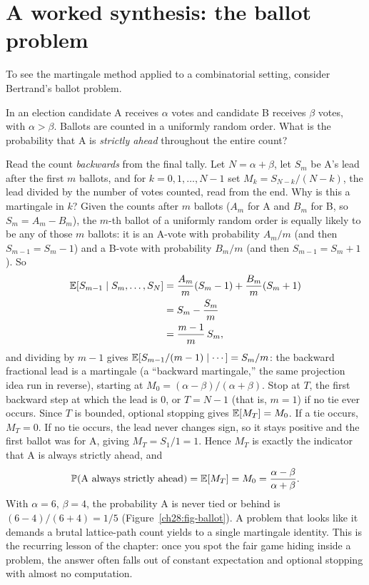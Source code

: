 \section{A worked synthesis: the ballot problem}
\label{ch28:ballot}

To see the martingale method applied to a combinatorial setting, consider Bertrand's ballot problem.

\begin{example}
\label{ch28:ex-ballot}
In an election candidate A receives $\alpha$ votes and candidate B receives $\beta$ votes, with
$\alpha > \beta$. Ballots are counted in a uniformly random order. What is the probability that A is
\emph{strictly ahead} throughout the entire count?

Read the count \emph{backwards} from the final tally. Let $N = \alpha + \beta$, let $S_m$ be A's
lead after the first $m$ ballots, and for $k = 0, 1, \dots, N-1$ set $M_k = S_{N-k}/(N-k)$, the
lead divided by the number of votes counted, read from the end. Why is this a martingale in $k$?
Given the counts after $m$ ballots ($A_m$ for A and $B_m$ for B, so $S_m = A_m - B_m$), the
$m$-th ballot of a uniformly random order is equally likely to be any of those $m$ ballots: it
is an A-vote with probability $A_m/m$ (and then $S_{m-1} = S_m - 1$) and a B-vote with
probability $B_m/m$ (and then $S_{m-1} = S_m + 1$). So
\begin{align*}
  \operatorname{\mathbb{E}}[S_{m-1} \mid S_m, \dots, S_N]
  &= \frac{A_m}{m}(S_m - 1) + \frac{B_m}{m}(S_m + 1) \\
  &= S_m - \frac{S_m}{m} \\
  &= \frac{m-1}{m}\,S_m,
\end{align*}
and dividing by $m - 1$ gives $\operatorname{\mathbb{E}}[S_{m-1}/(m-1) \mid \cdots] = S_m/m$: the backward fractional
lead is a martingale (a ``backward martingale,'' the same projection idea run in reverse),
starting at $M_0 = (\alpha - \beta)/(\alpha + \beta)$. Stop at $T$, the first backward step at
which the lead is $0$, or $T = N-1$ (that is, $m = 1$) if no tie ever occurs. Since $T$ is
bounded, optional stopping gives $\operatorname{\mathbb{E}}[M_T] = M_0$. If a tie occurs, $M_T = 0$. If no tie occurs,
the lead never changes sign, so it stays positive and the first ballot was for A, giving
$M_T = S_1/1 = 1$. Hence $M_T$ is exactly the indicator that A is always strictly ahead, and
\[
  \operatorname{\mathbb{P}}(\text{A always strictly ahead}) = \operatorname{\mathbb{E}}[M_T] = M_0 = \frac{\alpha - \beta}{\alpha + \beta}.
\]
With $\alpha = 6$, $\beta = 4$, the probability A is never tied or behind is $(6-4)/(6+4) = 1/5$ (Figure~\ref{ch28:fig-ballot}). A
problem that looks like it demands a brutal lattice-path count yields to a single martingale identity.
This is the recurring lesson of the chapter: once you spot the fair game hiding inside a problem, the
answer often falls out of constant expectation and optional stopping with almost no computation.
\end{example}

